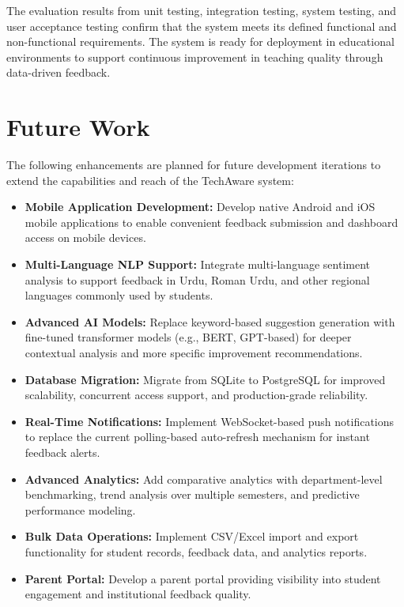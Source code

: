 The evaluation results from unit testing, integration testing, system testing, and user acceptance testing confirm that the system meets its defined functional and non-functional requirements. The system is ready for deployment in educational environments to support continuous improvement in teaching quality through data-driven feedback.


\section{Future Work}

The following enhancements are planned for future development iterations to extend the capabilities and reach of the TechAware system:

\begin{itemize}
    \item \textbf{Mobile Application Development:} Develop native Android and iOS mobile applications to enable convenient feedback submission and dashboard access on mobile devices.
    \item \textbf{Multi-Language NLP Support:} Integrate multi-language sentiment analysis to support feedback in Urdu, Roman Urdu, and other regional languages commonly used by students.
    \item \textbf{Advanced AI Models:} Replace keyword-based suggestion generation with fine-tuned transformer models (e.g., BERT, GPT-based) for deeper contextual analysis and more specific improvement recommendations.
    \item \textbf{Database Migration:} Migrate from SQLite to PostgreSQL for improved scalability, concurrent access support, and production-grade reliability.
    \item \textbf{Real-Time Notifications:} Implement WebSocket-based push notifications to replace the current polling-based auto-refresh mechanism for instant feedback alerts.
    \item \textbf{Advanced Analytics:} Add comparative analytics with department-level benchmarking, trend analysis over multiple semesters, and predictive performance modeling.
    \item \textbf{Bulk Data Operations:} Implement CSV/Excel import and export functionality for student records, feedback data, and analytics reports.
    \item \textbf{Parent Portal:} Develop a parent portal providing visibility into student engagement and institutional feedback quality.
\end{itemize}


